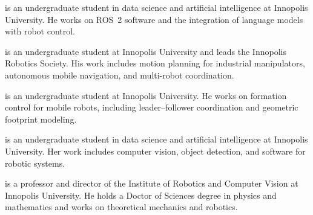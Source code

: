 \documentclass[pdflatex,sn-mathphys-num]{sn-jnl}
\begin{document}
\begin{biography}{}{\author{Dmitrii Vizitei} is an undergraduate student in
data science and artificial intelligence at Innopolis University. He works on
ROS~2 software and the integration of language models with robot control.}
\end{biography}

\begin{biography}{}{\author{Evgenii Shlomov} is an undergraduate student at
Innopolis University and leads the Innopolis Robotics Society. His work
includes motion planning for industrial manipulators, autonomous mobile
navigation, and multi-robot coordination.}
\end{biography}

\begin{biography}{}{\author{Senya Belykh} is an undergraduate student at
Innopolis University. He works on formation control for mobile robots,
including leader--follower coordination and geometric footprint modeling.}
\end{biography}

\begin{biography}{}{\author{Anastasia Malakhova} is an undergraduate student
in data science and artificial intelligence at Innopolis University. Her work
includes computer vision, object detection, and software for robotic systems.}
\end{biography}

\begin{biography}{}{\author{Alexander Maloletov} is a professor and director
of the Institute of Robotics and Computer Vision at Innopolis University.
He holds a Doctor of Sciences degree in physics and mathematics and works
on theoretical mechanics and robotics.}
\end{biography}
\end{document}
